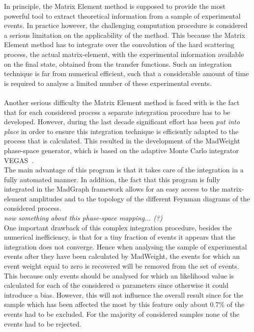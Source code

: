In principle, the Matrix Element method is supposed to provide the most powerful tool to extract theoretical information from a sample of experimental events.
In practice however, the challenging computation procedure is considered a serious limitation on the applicability of the method.
This because the Matrix Element method has to integrate over the convolution of the hard scattering process, the actual matrix-element, with the experimental information available on the final state, obtained from the transfer functions.
Such an integration technique is far from numerical efficient, such that a considerable amount of time is required to analyse a limited number of these experimental events.
\\
\\
Another serious difficulty the Matrix Element method is faced with is the fact that for each considered process a separate integration procedure has to be developed.
However, during the last decade significant effort has been \textit{put into place} in order to ensure this integration technique is efficiently adapted to the process that is calculated.
This resulted in the development of the MadWeight phase-space generator, which is based on the adaptive Monte Carlo integrator VEGAS~\cite{VEGAS}.
\\
The main advantage of this program is that it takes care of the integration in a fully automated manner.
In addition, the fact that this program is fully integrated in the MadGraph framework allows for an easy access to the matrix-element amplitudes and to the topology of the different Feynman diagrams of the considered process.
\\
\textit{now something about this phase-space mapping... (?)}
\\

One important drawback of this complex integration procedure, besides the numerical inefficiency, is that for a tiny fraction of events it appears that the integration does not converge.
Hence when analysing the sample of experimental events after they have been calculated by MadWeight, the events for which an event weight equal to zero is recovered will be removed from the set of events.
This because only events should be analysed for which an likelihood value is calculated for each of the considered $\alpha$ parameters since otherwise it could introduce a bias.
However, this will not influence the overall result since for the sample which has been affected the most by this feature only about $0.7\%$ of the events had to be excluded. For the majority of considered samples none of the events had to be rejected.

